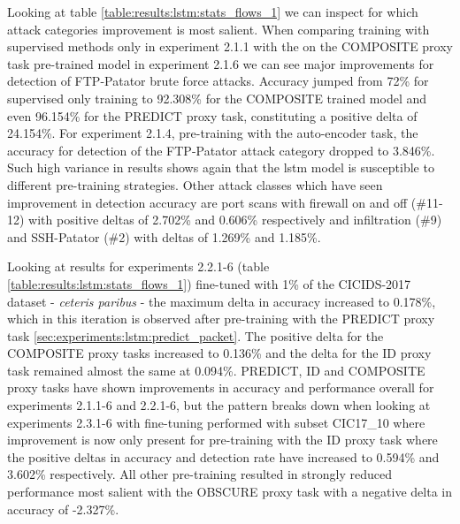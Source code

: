 Looking at table \ref{table:results:lstm:stats_flows_1} we can inspect for which attack categories improvement is most salient. When comparing training with supervised methods only in experiment 2.1.1 with the on the COMPOSITE proxy task pre-trained model in experiment 2.1.6 we can see major improvements for detection of FTP-Patator brute force attacks. Accuracy jumped from 72\% for supervised only training to 92.308\% for the COMPOSITE trained model and even 96.154\% for the PREDICT proxy task, constituting a positive delta of 24.154\%. For experiment 2.1.4, pre-training with the auto-encoder task, the accuracy for detection of the FTP-Patator attack category dropped to 3.846\%. Such high variance in results shows again that the \gls{lstm} model is susceptible to different pre-training strategies. Other attack classes which have seen improvement in detection accuracy are port scans with firewall on and off (\#11-12) with positive deltas of 2.702\% and 0.606\% respectively and infiltration (\#9) and SSH-Patator (\#2) with deltas of 1.269\% and 1.185\%. \par





Looking at results for experiments 2.2.1-6 (table \ref{table:results:lstm:stats_flows_1}) fine-tuned with 1\% of the CICIDS-2017 dataset - \textit{ceteris paribus} - the maximum delta in accuracy increased to 0.178\%, which in this iteration is observed after pre-training with the PREDICT proxy task \ref{sec:experiments:lstm:predict_packet}. The positive delta for the COMPOSITE proxy tasks increased to 0.136\% and the delta for the ID proxy task remained almost the same at 0.094\%. PREDICT, ID and COMPOSITE proxy tasks have shown improvements in accuracy and performance overall for experiments 2.1.1-6 and 2.2.1-6, but the pattern breaks down when looking at experiments 2.3.1-6 with fine-tuning performed with subset CIC17\_10 where improvement is now only present for pre-training with the ID proxy task where the positive deltas in accuracy and detection rate have increased to 0.594\% and 3.602\% respectively. All other pre-training resulted in strongly reduced performance most salient with the OBSCURE proxy task with a negative delta in accuracy of -2.327\%. \par 



